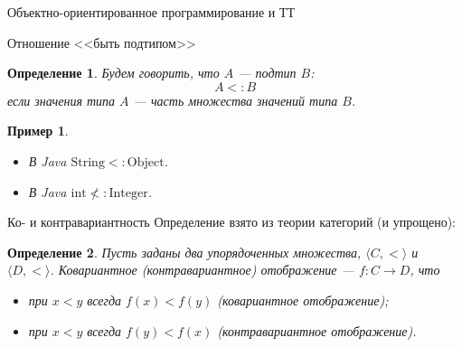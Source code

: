 \documentclass[aspectratio=169,dvipsnames,usenames]{beamer}
\begin{document}
\newtheorem{dfn}{Определение}[section]
\newtheorem{nte}{Замечание}[section]

\newtheorem{axiom}{Аксиома}[section]
\newtheorem{thm}{Теорема}[section]
\newtheorem{lmm}[theorem]{Лемма}
\newtheorem{statement}{Утверждение}[section]
\newtheorem{oun_paragraph}{Пункт}[section]
\newtheorem{cons}{Следствие}[section]
\newtheorem*{exm}{Пример}

\newcommand{\comb}[1]{\operatorname{\mathcal{#1}}}
\newcommand{\func}[1]{\operatorname{#1}}
\newcommand{\reduction}[1]{{\color{OrangeRed}#1}}
\newcommand{\set}[1]{\left\{#1\right\}}

\def\from#1{\par \parbox{0.7\textwidth}{\par \hfill\raggedleft \it #1}} 

\begin{frame}{}
\begin{center}
{\LARGE Объектно-ориентированное программирование и ТТ}
\end{center}
\end{frame}

\begin{frame}{Отношение <<быть подтипом>>}
\begin{dfn}
Будем говорить, что $A$ --- подтип $B$: $$A <: B$$
если значения типа $A$ --- часть множества значений типа $B$.
\end{dfn}
\begin{exm}
\begin{itemize}
\item В Java $\text{String} <: \text{Object}$.
\item В Java $\text{int} \not<: \text{Integer}$.
\end{itemize}
\end{exm}
\end{frame}

\begin{frame}{Ко- и контравариантность}
Определение взято из теории категорий (и упрощено):
\begin{dfn}
Пусть заданы два упорядоченных множества, $\langle C, < \rangle$ и $\langle D, < \rangle$.
Ковариантное (контравариантное) отображение --- $f: C \rightarrow D$, что 
\begin{itemize}
\item при $x<y$ всегда $f(x) < f(y)$ (ковариантное отображение);
\item при $x<y$ всегда $f(y) < f(x)$ (контравариантное отображение).
\end{itemize}
\end{dfn}
\end{frame}
\end{document}

